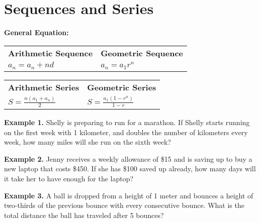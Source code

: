 \section{Sequences and Series}

\bigskip
\textbf{General Equation:}

\bigskip
\begin{tabularx}{\textwidth}{*2{@{}>{\centering\arraybackslash}X}}
\textbf{Arithmetic Sequence} & \textbf{Geometric Sequence}\\
$a_n=a_n+nd$ & $a_n=a_1r^n$
\end{tabularx}

\vfill
\begin{tabularx}{\textwidth}{*2{@{}>{\centering\arraybackslash}X}}
\textbf{Arithmetic Series} & \textbf{Geometric Series}\\
$S=\frac{n(a_1+a_n)}{2}$ & $S=\frac{a_1(1-r^n)}{1-r}$
\end{tabularx}

\vfill
\textbf{Example 1.} Shelly is preparing to run for a marathon. If Shelly starts running on the first week with 1 kilometer, and doubles the number of kilometers every week, how many miles will she run on the sixth week?

\vfill
\textbf{Example 2.} Jenny receives a weekly allowance of \$15 and is saving up to buy a new laptop that costs \$450. If she has \$100 saved up already, how many days will it take her to have enough for the laptop?

\vfill
\textbf{Example 3.} A ball is dropped from a height of 1 meter and bounces a height of two-thirds of the previous bounce with every consecutive bounce. What is the total distance the ball has traveled after 5 bounces?

